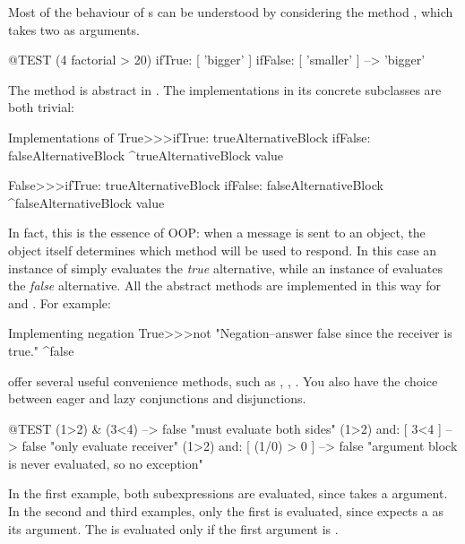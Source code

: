 \documentclass[a4paper,10pt,twoside]{book}
\begin{document}
Most of the behaviour of s can be understood by considering the method , which takes two  as arguments.

\begin{code}{@TEST}
(4 factorial > 20) ifTrue: [ 'bigger' ] ifFalse: [ 'smaller' ] --> 'bigger'
\end{code}

The method is abstract in .
The implementations in its concrete subclasses are both trivial:

\begin{method}{Implementations of }
True>>>ifTrue: trueAlternativeBlock ifFalse: falseAlternativeBlock 
    ^trueAlternativeBlock value

False>>>ifTrue: trueAlternativeBlock ifFalse: falseAlternativeBlock 
    ^falseAlternativeBlock value
\end{method}

In fact, this is the essence of OOP: when a message is sent to an object, the object itself determines which method will be used to respond. In this case an instance of  simply evaluates the \emph{true} alternative, while an instance of  evaluates the \emph{false} alternative.  All the abstract  methods are implemented in this way for  and . For example:

\begin{method}{Implementing negation}
True>>>not
    "Negation--answer false since the receiver is true."
    ^false
\end{method}

 offer several useful convenience methods, such as , , . You also have the choice between eager and lazy conjunctions and disjunctions.

\begin{code}{@TEST}
(1>2) & (3<4)              --> false    "must evaluate both sides"
(1>2) and: [ 3<4 ]        --> false    "only evaluate receiver"
(1>2) and: [ (1/0) > 0 ] --> false    "argument block is never evaluated, so no exception"
\end{code}

In the first example, both  subexpressions are evaluated, since  takes a  argument.
In the second and third examples, only the first is evaluated, since  expects a  as its argument.  The  is evaluated only if the first argument is .
\end{document}
